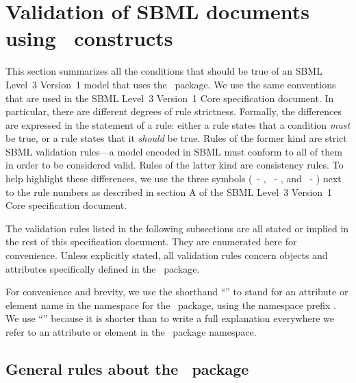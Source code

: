 
\section{Validation of SBML documents using \multi\ constructs}
\label{def:apdx-validation}

This section summarizes all the conditions that should be true of an SBML Level~3 Version~1 model that uses the \multi\ package.  We use the same conventions that are used in the SBML Level~3 Version~1 Core specification document.  In particular, there are different degrees of rule strictness.  Formally, the differences are expressed in the statement of a rule: either a rule states that a condition \emph{must} be true, or a rule states that it \emph{should} be true.  Rules of the former kind are strict SBML validation rules---a model encoded in SBML must conform to all of them in order to be considered valid.  Rules of the latter kind are consistency rules.  To help highlight these differences, we use the three symbols (\vSymbol\ - , \cSymbol\ - , and \mSymbol\ - ) next to the rule numbers as described in section A of the SBML Level~3 Version~1 Core specification document. 

The validation rules listed in the following subsections are all stated or implied in the rest of this specification document.  They are enumerated here for convenience.  Unless explicitly stated, all validation rules concern objects and attributes specifically defined in the \multi\ package.

For convenience and brevity, we use the shorthand ``'' to stand for an attribute or element name  in the namespace for the \multi\ package, using the namespace prefix . We use ``'' because it is shorter than to write a full explanation everywhere we refer to an attribute or element in the \multi\ package namespace.


\subsection*{General rules about the \multi\ package}

  
